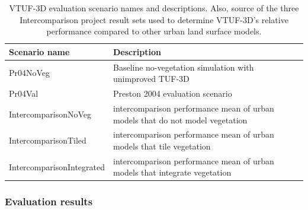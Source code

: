 \documentclass[final,3p,times,authoryear]{elsarticle}
\begin{document}
\begin{center}
\begin{table}[!htbp]
\caption{VTUF-3D evaluation scenario names and descriptions. Also, source of the three Intercomparison project result sets used to determine VTUF-3D's relative performance compared to other urban land surface models.\label{tab:simscompared}} 
\begin{tabular}{  | p{0.30\linewidth} | p{0.70\linewidth} |  } 
\hline \textbf{Scenario name} & \textbf{Description}  \\ \hline
Pr04NoVeg & Baseline no-vegetation simulation with unimproved TUF-3D    \\ \hline
Pr04Val & Preston 2004 evaluation scenario  \\ \hline	
IntercomparisonNoVeg & \cite{Best2012} intercomparison performance mean of urban models that do not model vegetation  \\ \hline
IntercomparisonTiled & \cite{Best2012} intercomparison performance mean of urban models that tile vegetation  \\ \hline
IntercomparisonIntegrated & \cite{Best2012} intercomparison performance mean of urban models that integrate vegetation \\ \hline
  \end{tabular} 
\end{table}
\end{center}


\subsubsection{Evaluation results}\label{sec:evalresults}
\end{document}
